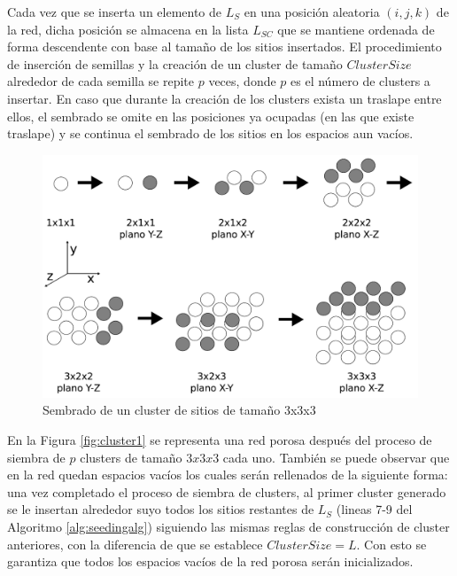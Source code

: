 Cada vez que se inserta un elemento de $L_S$ en una posición aleatoria $(i,j,k)$ de la red, dicha posición se almacena en 
la lista $L_{SC}$ que se mantiene ordenada de forma descendente con base al tamaño de los sitios insertados. El procedimiento de 
inserción de semillas y la creación de un cluster de tamaño $ClusterSize$ alrededor de cada semilla se repite $p$ veces, donde $p$ 
es el número de clusters a insertar. En caso que durante la creación de los clusters exista un traslape entre ellos, el sembrado 
se omite en las posiciones ya ocupadas (en las que existe traslape) y se continua el sembrado de los sitios en los espacios aun vacíos.\\

\begin{figure}[hbtp]
\centering
\includegraphics[width=5.0in]{img/cluster_es.pdf}
\caption{Sembrado de un cluster de sitios de tamaño 3x3x3}
\label{fig:cluster}
\end{figure}

En la Figura \ref{fig:cluster1} se representa una red porosa después del proceso de siembra de $p$ clusters de tamaño $3x3x3$ cada uno.
También se puede observar que en la red quedan espacios vacíos  los cuales serán rellenados de la siguiente forma: una vez completado
el proceso de siembra de clusters, al primer cluster generado se le insertan alrededor suyo todos los sitios restantes de $L_S$ 
(lineas 7-9 del Algoritmo \ref{alg:seedingalg}) siguiendo las mismas reglas de construcción de cluster anteriores, con la diferencia 
de que se establece $ClusterSize=L$. Con esto se garantiza que todos los espacios vacíos de la red porosa serán inicializados.\\


